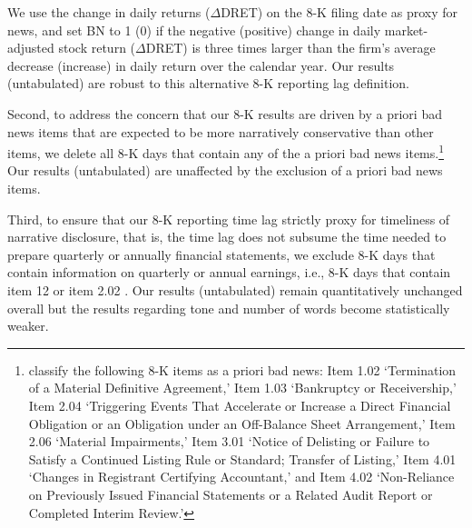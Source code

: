 \documentclass[letterpaper,12pt]{article}
\begin{document}
\begin{spacing}{1.5}
We use the change in daily returns ($\Delta$DRET) on the 8-K filing date as proxy for news, and set BN to 1 (0) if the negative (positive) change in daily market-adjusted stock return ($\Delta$DRET) is three times larger than the firm's average decrease (increase) in daily return over the calendar year. Our results (untabulated) are robust to this alternative 8-K reporting lag definition. 


Second, to address the concern that our 8-K results are driven by a priori bad news items that are expected to be more narratively conservative than other items, we delete all 8-K days that contain any of the a priori bad news items.\footnote{ classify the following 8-K items as a priori bad news: Item 1.02 `Termination of a Material Definitive Agreement,' Item 1.03 `Bankruptcy or Receivership,' Item 2.04 `Triggering Events That Accelerate or Increase a Direct Financial Obligation or an Obligation under an Off-Balance Sheet Arrangement,' Item 2.06 `Material Impairments,' Item 3.01 `Notice of Delisting or Failure to Satisfy a Continued Listing Rule or Standard; Transfer of Listing,' Item 4.01 `Changes in Registrant Certifying Accountant,' and Item 4.02 `Non-Reliance on Previously Issued Financial Statements or a Related Audit Report or Completed Interim Review.'} Our results (untabulated) are unaffected by the exclusion of a priori bad news items. 

Third, to ensure that our 8-K reporting time lag strictly proxy for timeliness of narrative disclosure, that is, the time lag does not subsume the time needed to prepare quarterly or annually financial statements, we exclude 8-K days that contain information on quarterly or annual earnings, i.e., 8-K days that contain item 12 or item 2.02 \cite{segalAreManagersStrategic2016}. Our results (untabulated) remain quantitatively unchanged overall but the results regarding tone and number of words become statistically weaker. 




\end{spacing}
\end{document}
